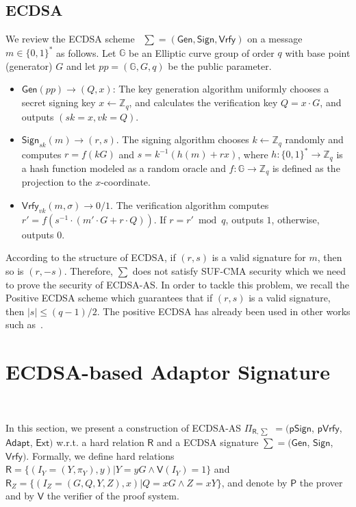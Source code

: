 \documentclass{llncs}
\begin{document}
\subsection{ECDSA} 
We review the ECDSA scheme~\cite{ECDSA} $\sum=(\mathsf{Gen}, \mathsf{Sign}, \mathsf{Vrfy})$ on a message $m\in \{0,1\}^*$ as follows.  Let $\mathbb{G}$ be an Elliptic curve group of order $q$ with base point (generator) $G$ and let $pp=(\mathbb{G},G,q)$ be the public parameter. 
\begin{itemize}
\item $\mathsf{Gen}(pp)\rightarrow (Q,x)$: The key generation algorithm uniformly chooses a secret signing key $x\leftarrow \mathbb{Z}_q$, and calculates the verification key $Q=x\cdot G$, and outputs $(sk=x,vk=Q)$.
\item $\mathsf{Sign}_{sk}(m)\rightarrow (r,s)$. The signing algorithm chooses $k\leftarrow \mathbb{Z}_q$ randomly and computes $r = f(kG)$ and $s = k^{-1}(h(m) + rx)$, where $h: \{0,1\}^* \rightarrow \mathbb{Z}_q$ is a hash function modeled as a random oracle and $f: \mathbb{G} \rightarrow \mathbb{Z}_q$ is defined as the projection to the $x$-coordinate.
\item $\mathsf{Vrfy}_{vk}(m,\sigma)\rightarrow 0/1$. The verification algorithm computes $r'=f(s^{-1}\cdot (m'\cdot G+r\cdot Q))$. If $r=r'\bmod q$, outputs $1$, otherwise, outputs $0$.
\end{itemize}

According to the structure of ECDSA, if $(r, s)$ is a valid signature for $m$, then so is $(r,-s)$. Therefore, $\sum$ does not satisfy SUF-CMA security which we need to prove the security of ECDSA-AS. In order to tackle this problem, we recall the Positive ECDSA scheme which guarantees that if $(r, s)$ is a valid signature, then $|s| \leq (q - 1)/2$. The positive ECDSA has already been used in other works such as~\cite{Lin17}.

\section{ECDSA-based Adaptor Signature}~\label{ECDSA-based Adaptor Signature}

In this section, we present a construction of ECDSA-AS $\Pi_{\mathsf{R},\sum}$ $= ($$\mathsf{pSign}$, $\mathsf{pVrfy}$, $\mathsf{Adapt}$, $\mathsf{Ext})$ w.r.t. a hard relation $\mathsf{R}$ and a ECDSA signature $\sum = (\mathsf{Gen}$, $\mathsf{Sign}$, $\mathsf{Vrfy})$. Formally, we define hard relations $\mathsf{R}= \{(I_Y=(Y,\pi_Y), y) | Y = yG \wedge \mathsf{V}(I_Y) = 1\}$ and $\mathsf{R}_Z=\{(I_Z=(G,Q,Y,Z), x) | Q = xG \wedge Z=xY\}$, and denote by $\mathsf{P}$ the prover and by $\mathsf{V}$ the verifier of the proof system.
\end{document}
